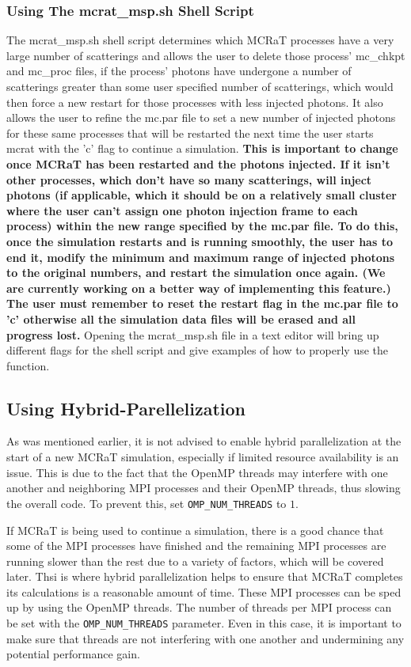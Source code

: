 \documentclass[12pt,a4paper]{article}
\begin{document}
 \subsubsection{Using The mcrat\_msp.sh Shell Script}
 The mcrat\_msp.sh shell script determines which MCRaT processes have a very large number of scatterings and allows the user to delete those process' mc\_chkpt and mc\_proc files, if the process' photons have undergone a number of scatterings greater than some user specified number of scatterings, which would then force a new restart for those processes with less injected photons. It also allows the user to refine the mc.par file to set a new number of injected photons for these same processes that will be restarted the next time the user starts mcrat with the 'c' flag to continue a simulation. {\bf This is important to change once MCRaT has been restarted and the photons injected. If it isn't other processes, which don't have so many scatterings, will inject photons (if applicable, which it should be on a relatively small cluster where the user can't assign one photon injection frame to each process) within the new range specified by the mc.par file. To do this, once the simulation restarts and is running smoothly, the user has to end it, modify the minimum and maximum range of injected photons to the original numbers, and restart the simulation once again. (We are currently working on a better way of implementing this feature.) The user must remember to reset the restart flag in the mc.par file to 'c' otherwise all the simulation data files will be erased and all progress lost.} Opening the mcrat\_msp.sh file in a text editor will bring up different flags for the shell script and give examples of how to properly use the function.
 
 \subsection{Using Hybrid-Parellelization}
 As was mentioned earlier, it is not advised to enable hybrid parallelization at the start of a new MCRaT simulation, especially if limited resource availability is an issue. This is due to the fact that the OpenMP threads may interfere with one another and neighboring MPI processes and their OpenMP threads, thus slowing the overall code. To prevent this, set \texttt{OMP\_NUM\_THREADS} to $1$.
 
 If MCRaT is being used to continue a simulation, there is a good chance that some of the MPI processes have finished and the remaining MPI processes are running slower than the rest due to a variety of factors, which will be covered later. Thsi is where hybrid parallelization helps to ensure that MCRaT completes its calculations is a reasonable amount of time. These MPI processes can be sped up by using the OpenMP threads. The number of threads per MPI process can be set with the \texttt{OMP\_NUM\_THREADS} parameter. Even in this case, it is important to make sure that threads are not interfering with one another and undermining any potential performance gain.
 
\end{document}
